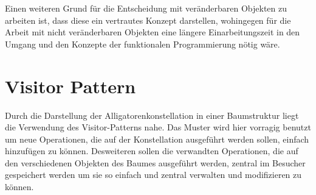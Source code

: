 Einen weiteren Grund für die Entscheidung mit veränderbaren Objekten zu arbeiten ist, dass diese ein vertrautes Konzept darstellen, wohingegen für die Arbeit mit nicht veränderbaren Objekten eine längere Einarbeitungszeit in den Umgang und den Konzepte der funktionalen Programmierung nötig wäre.

\section{Visitor Pattern}
Durch die Darstellung der Alligatorenkonstellation in einer Baumstruktur liegt die Verwendung des Visitor-Patterns nahe.
Das Muster wird hier vorragig benutzt um neue Operationen, die auf der Konstellation ausgeführt werden sollen, einfach hinzufügen zu können.
Desweiteren sollen die verwandten Operationen, die auf den verschiedenen Objekten des Baumes ausgeführt werden, zentral im Besucher gespeichert werden um sie so einfach und zentral verwalten und modifizieren zu können.
